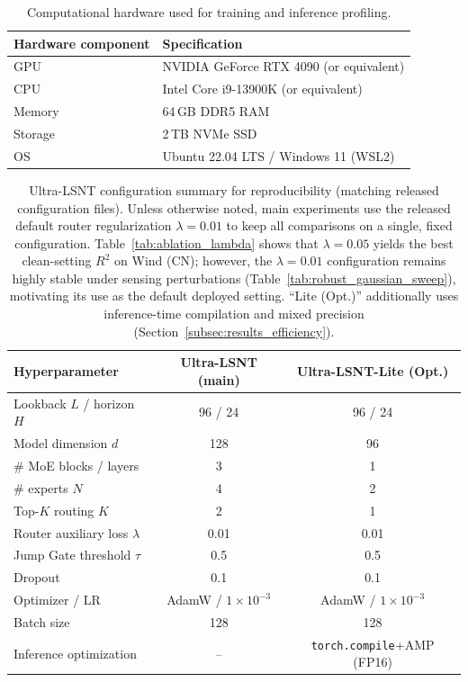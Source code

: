 \documentclass[review,3p,times]{elsarticle}
\begin{document}
\begin{table}[t]
\centering
\caption{Computational hardware used for training and inference profiling.}
\label{tab:impl_hardware}
\begin{tabular}{ll}
\toprule
Hardware component & Specification \\
\midrule
GPU & NVIDIA GeForce RTX 4090 (or equivalent) \\
CPU & Intel Core i9-13900K (or equivalent) \\
Memory & 64\,GB DDR5 RAM \\
Storage & 2\,TB NVMe SSD \\
OS & Ubuntu 22.04 LTS / Windows 11 (WSL2) \\
\bottomrule
\end{tabular}
\end{table}
\begin{table}[t]
\centering
\caption{Ultra-LSNT configuration summary for reproducibility (matching released configuration files). Unless otherwise noted, main experiments use the released default router regularization $\lambda=0.01$ to keep all comparisons on a single, fixed configuration. Table~\ref{tab:ablation_lambda} shows that $\lambda=0.05$ yields the best clean-setting $R^2$ on Wind (CN); however, the $\lambda=0.01$ configuration remains highly stable under sensing perturbations (Table~\ref{tab:robust_gaussian_sweep}), motivating its use as the default deployed setting. ``Lite (Opt.)'' additionally uses inference-time compilation and mixed precision (Section~\ref{subsec:results_efficiency}).}
\label{tab:model_config}
\begin{tabular}{lcc}
\toprule
Hyperparameter & Ultra-LSNT (main) & Ultra-LSNT-Lite (Opt.) \\
\midrule
Lookback $L$ / horizon $H$ & 96 / 24 & 96 / 24 \\
Model dimension $d$ & 128 & 96 \\
\# MoE blocks / layers & 3 & 1 \\
\# experts $N$ & 4 & 2 \\
Top-$K$ routing $K$ & 2 & 1 \\
Router auxiliary loss $\lambda$ & 0.01 & 0.01 \\
Jump Gate threshold $\tau$ & 0.5 & 0.5 \\
Dropout & 0.1 & 0.1 \\
Optimizer / LR & AdamW / $1\times10^{-3}$ & AdamW / $1\times10^{-3}$ \\
Batch size & 128 & 128 \\
Inference optimization & -- & \texttt{torch.compile}+AMP (FP16) \\
\bottomrule
\end{tabular}
\end{table}
\end{document}
